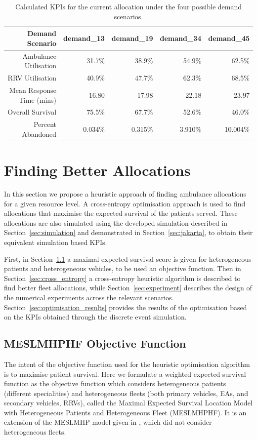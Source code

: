 \documentclass[preprint,12pt]{elsarticle}
\begin{document}
\begin{table}
\begin{center}
\small
\begin{tabular}{rrrrr}
\toprule
Demand Scenario & \textbf{demand\_13} & \textbf{demand\_19} & \textbf{demand\_34} & \textbf{demand\_45} \\
\midrule
Ambulance Utilisation & 31.7\% & 38.9\% & 54.9\% & 62.5\% \\
RRV Utilisation & 40.9\% & 47.7\% & 62.3\% & 68.5\% \\
Mean Response Time (mins) & 16.80 & 17.98 & 22.18 & 23.97 \\
Overall Survival & 75.5\% & 67.7\% & 52.6\% & 46.0\% \\
Percent Abandoned & 0.034\% & 0.315\% & 3.910\% & 10.004\% \\
\bottomrule
\end{tabular}
\caption{Calculated KPIs for the current allocation under the four possible demand scenarios.}
\label{tbl:demand_results}
\end{center}
\end{table}


\section{Finding Better Allocations}\label{sec:betterallocations}
In this section we propose a heuristic approach of finding ambulance allocations for a given resource level. A cross-entropy optimisation approach is used to find allocations that maximise the expected survival of the patients served. These allocations are also simulated using the developed simulation  described in Section~\ref{sec:simulation} and demonstrated in Section~\ref{sec:jakarta}, to obtain their equivalent simulation based KPIs.

First, in Section~\ref{sec:objective_function} a maximal expected survival score is given for heterogeneous patients and heterogeneous vehicles, to be used an objective function. Then in Section~\ref{sec:cross_entropy} a cross-entropy heuristic algorithm is described to find better fleet allocations, while Section~\ref{sec:experiment} describes the design of the numerical experiments across the relevant scenarios. Section~\ref{sec:optimisation_results} provides the results of the optimisation based on the KPIs obtained through the discrete event simulation.


\subsection{MESLMHPHF Objective Function}\label{sec:objective_function}
The intent of the objective function used for the heuristic optimisation algorithm is to maximise patient survival. Here we formulate a weighted expected survival function as the objective function which considers heterogeneous patients (different specialities) and heterogeneous fleets (both primary vehicles, EAs, and secondary vehicles, RRVs), called the Maximal Expected Survival Location Model with Heterogeneous Patients and Heterogeneous Fleet (MESLMHPHF). It is an extension of the MESLMHP model given in \cite{Knight2012918}, which did not consider heterogeneous fleets.
\end{document}
